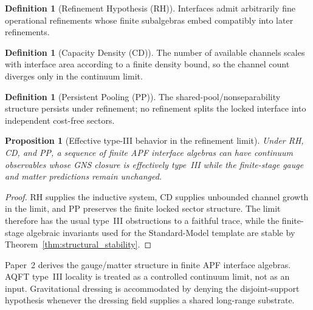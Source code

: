 \documentclass[11pt]{article}
\newtheorem{proposition}[theorem]{Proposition}
\theoremstyle{definition}
\newtheorem{definition}[theorem]{Definition}
\begin{document}
\begin{definition}[Refinement Hypothesis (RH)]\label{def:RH}
Interfaces admit arbitrarily fine operational refinements whose finite
subalgebras embed compatibly into later refinements.
\end{definition}

\begin{definition}[Capacity Density (CD)]\label{def:CD}
The number of available channels scales with interface area according to a
finite density bound, so the channel count diverges only in the continuum
limit.
\end{definition}

\begin{definition}[Persistent Pooling (PP)]\label{def:PP}
The shared-pool/nonseparability structure persists under refinement; no
refinement splits the locked interface into independent cost-free sectors.
\end{definition}

\begin{proposition}[Effective type-III behavior in the refinement
limit]\label{prop:effective_typeIII}
Under RH, CD, and PP, a sequence of finite APF interface algebras can have
continuum observables whose GNS closure is effectively type~III while the
finite-stage gauge and matter predictions remain unchanged.
\end{proposition}

\begin{proof}
RH supplies the inductive system, CD supplies unbounded channel growth in
the limit, and PP preserves the finite locked sector structure.  The limit
therefore has the usual type~III obstructions to a faithful trace, while
the finite-stage algebraic invariants used for the Standard-Model template
are stable by Theorem~\ref{thm:structural_stability}.
\end{proof}

\begin{tcolorbox}[apfbox, title={Regime: finite-capacity admissibility algebras}]
Paper~2 derives the gauge/matter structure in finite APF interface
algebras.  AQFT type~III locality is treated as a controlled continuum
limit, not as an input.  Gravitational dressing is accommodated by denying
the disjoint-support hypothesis whenever the dressing field supplies a
shared long-range substrate.
\end{tcolorbox}

\newpage


\end{document}

